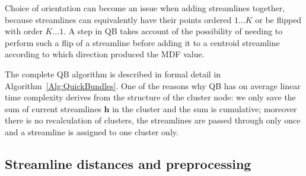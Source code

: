 \documentclass{bioinfo}
\begin{document}
\begin{methods}

Choice of orientation can become an issue when 
adding streamlines together, because 
streamlines
can equivalently have their points ordered $1 \dots K$ or be flipped with
order $K \dots 1$.
A step in QB takes account of the
possibility of needing to perform such a flip of a streamline before adding
it to a centroid streamline according to which direction produced
the MDF value.

The complete QB algorithm is described in formal detail in
Algorithm~\ref{Alg:QuickBundles}.  One of the reasons why
QB has on average linear time complexity derives from the structure of
the cluster node: we only save the sum of current streamlines
$\mathbf{h}$ in the cluster and the sum is cumulative; moreover there is
no recalculation of clusters, the streamlines are passed through only
once and a streamline is assigned to one cluster only.

\subsection{\label{sub:track-distances}Streamline distances and preprocessing}


\end{methods}
\end{document}
